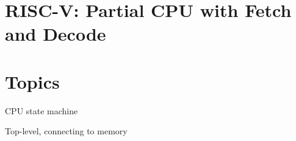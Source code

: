 

\section{RISC-V: Partial CPU with Fetch and Decode}



\section{Topics}

\begin{tightlist}

\item CPU state machine

\item Top-level, connecting to memory

\end{tightlist}


